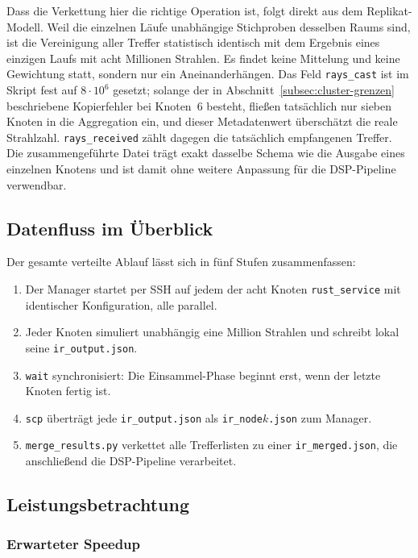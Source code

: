 Dass die Verkettung hier die richtige Operation ist, folgt direkt aus dem
Replikat-Modell. Weil die einzelnen Läufe unabhängige Stichproben desselben Raums
sind, ist die Vereinigung aller Treffer statistisch identisch mit dem Ergebnis
eines einzigen Laufs mit acht Millionen Strahlen. Es findet keine Mittelung und
keine Gewichtung statt, sondern nur ein Aneinanderhängen. Das Feld
\texttt{rays\_cast} ist im Skript fest auf $8 \cdot 10^{6}$ gesetzt; solange der in
Abschnitt~\ref{subsec:cluster-grenzen} beschriebene Kopierfehler bei Knoten~6
besteht, fließen tatsächlich nur sieben Knoten in die Aggregation ein, und dieser
Metadatenwert überschätzt die reale Strahlzahl. \texttt{rays\_received} zählt
dagegen die tatsächlich empfangenen Treffer. Die
zusammengeführte Datei trägt exakt dasselbe Schema wie die Ausgabe eines einzelnen
Knotens und ist damit ohne weitere Anpassung für die DSP-Pipeline verwendbar.

\subsection{Datenfluss im Überblick}
\label{subsec:cluster-datenfluss}

Der gesamte verteilte Ablauf lässt sich in fünf Stufen zusammenfassen:

\begin{enumerate}
    \item Der Manager startet per SSH auf jedem der acht Knoten
    \texttt{rust\_service} mit identischer Konfiguration, alle parallel.
    \item Jeder Knoten simuliert unabhängig eine Million Strahlen und schreibt
    lokal seine \texttt{ir\_output.json}.
    \item \texttt{wait} synchronisiert: Die Einsammel-Phase beginnt erst, wenn der
    letzte Knoten fertig ist.
    \item \texttt{scp} überträgt jede \texttt{ir\_output.json} als
    \texttt{ir\_node$k$.json} zum Manager.
    \item \texttt{merge\_results.py} verkettet alle Trefferlisten zu einer
    \texttt{ir\_merged.json}, die anschließend die DSP-Pipeline verarbeitet.
\end{enumerate}

\subsection{Leistungsbetrachtung}
\label{subsec:cluster-leistung}

\subsubsection{Erwarteter Speedup}
\label{subsubsec:speedup}

